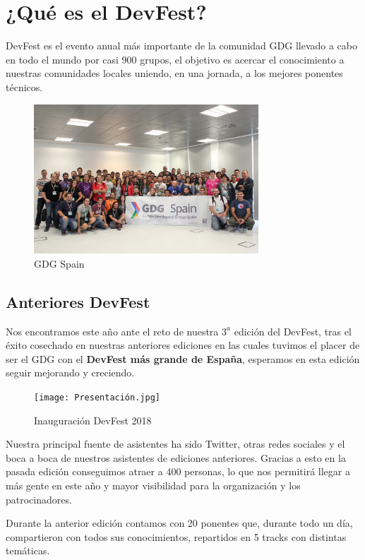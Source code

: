 \documentclass[12pt]{article}
\begin{document}
\section{¿Qué es el DevFest?}
DevFest es el evento anual más importante de la comunidad GDG llevado a cabo en todo el mundo por casi 900 grupos, el objetivo es acercar el conocimiento a nuestras comunidades locales uniendo, en una jornada, a los mejores ponentes técnicos.
\begin{figure}[h]
    \centering
    \includegraphics[width=0.75\textwidth]{GDG_Spain.jpg}
    \caption{GDG Spain}
    \label{fig:my_label}
\end{figure}
\subsection{Anteriores DevFest}
Nos encontramos este año ante el reto de nuestra $3^{a}$ edición del DevFest, tras el éxito cosechado en nuestras anteriores ediciones en las cuales tuvimos el placer de ser el GDG con el \textbf{DevFest más grande de España}, esperamos en esta edición seguir mejorando y creciendo.
\begin{figure}[h]
    \centering
    \texttt{[image: Presentación.jpg]}
    \caption{Inauguración DevFest 2018}
    \label{fig:my_label}
\end{figure}
Nuestra principal fuente de asistentes ha sido Twitter, otras redes sociales y el boca a boca de nuestros asistentes de ediciones anteriores. Gracias a esto en la pasada edición conseguimos atraer a 400 personas, lo que nos permitirá llegar a más gente en este año y mayor visibilidad para la organización y los patrocinadores.

Durante la anterior edición contamos con 20 ponentes que, durante todo un día, compartieron con todos sus conocimientos, repartidos en 5 tracks con distintas temáticas.
\end{document}
